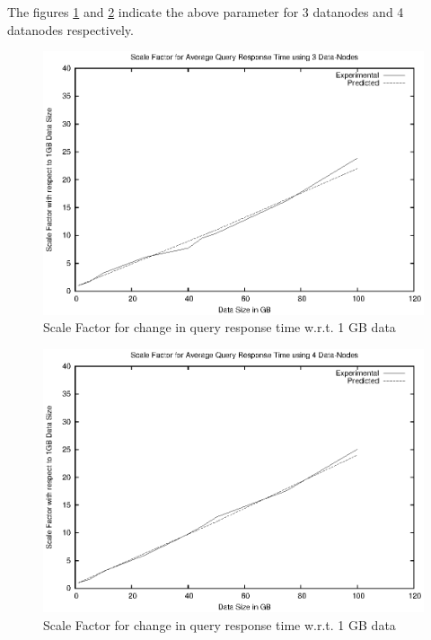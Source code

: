 \documentclass[12pt]{book}
\begin{document}
The figures \ref{sf3} and \ref{sf4} indicate the above parameter for 3 datanodes and 4 datanodes respectively.
\begin{figure}[!hbt]
 \centering
 \includegraphics[width=15cm]{sf3.eps}
\caption{Scale Factor for change in query response time w.r.t. 1 GB data \label{sf3}}
\end{figure}

\begin{figure}[!hbt]
\centering
 \includegraphics[width=15cm]{sf4.eps}
 \caption{Scale Factor for change in query response time w.r.t. 1 GB data \label{sf4}}
\end{figure}
\end{document}
